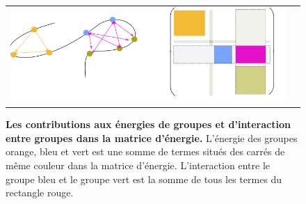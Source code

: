    \begin{figure}[!htbp]
     \centering
     \begin{tabular}{cc}
       \includegraphics[width=12cm]{figure/grp_matrix.png} &
     \end{tabular}
     
     \caption{\textbf{Les contributions aux énergies de groupes et d'interaction entre groupes dans la matrice d'énergie.} L'énergie des groupes orange, bleu et vert est une somme de termes situés des carrés de même couleur dans la matrice d'énergie. L'interaction entre le groupe bleu et le groupe vert est la somme de tous les termes du rectangle rouge.}
\label{fig:matrix_grp}
   \end{figure}
   


